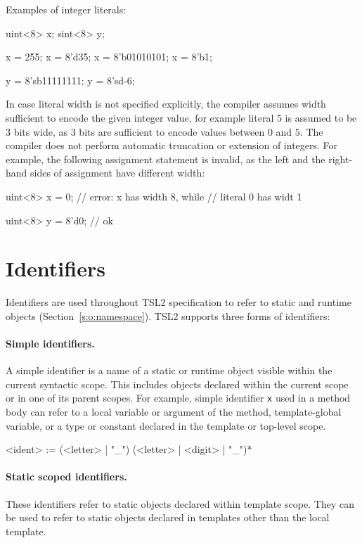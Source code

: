 \documentclass{report}
\newcommand{\src}[1]{\texttt{#1}}
\newcommand{\tsl}{TSL2 }
\begin{document}
Examples of integer literals:
\begin{tsllisting}{}
uint<8> x;
sint<8> y;

x = 255;
x = 8'd35;
x = 8'b01010101;
x = 8'b1;

y = 8'sb11111111;
y = 8'sd-6;
\end{tsllisting}

In case literal width is not specified explicitly, the compiler 
assumes width sufficient to encode the given integer value, for 
example literal $5$ is assumed to be $3$ bits wide, as $3$ bits 
are sufficient to encode values between $0$ and $5$.  The compiler 
does not perform automatic truncation or extension of integers.  
For example, the following assignment statement is invalid, as the 
left and the right-hand sides of assignment have different width:

\begin{tsllisting}{}
uint<8> x = 0; // error: x has width 8, while
               // literal 0 has widt 1

uint<8> y = 8'd0; // ok
\end{tsllisting}


\section{Identifiers}\label{s:r:identifiers}

Identifiers are used throughout \tsl specification to refer to 
static and runtime objects (Section~\ref{s:o:namespace}).  \tsl 
supports three forms of identifiers:

\paragraph{Simple identifiers.}  A simple identifier is a name of 
a static or runtime object visible within the current syntactic 
scope.  This includes objects declared within the current scope or 
in one of its parent scopes.  For example, simple identifier 
\src{x} used in a method body can refer to a local variable or 
argument of the method, template-global variable, or a type or 
constant declared in the template or top-level scope.

\begin{bnflisting}{}
<ident> := (<letter> | "_") (<letter> | <digit> | "_")*
\end{bnflisting}

\paragraph{Static scoped identifiers.} These identifiers refer to 
static objects declared within template scope.  They can be used 
to refer to static objects declared in templates other than the 
local template.
\end{document}
